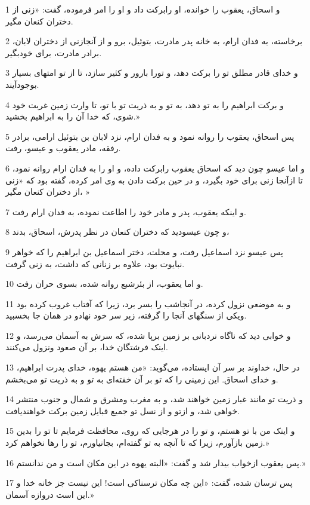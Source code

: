 \par 1 و اسحاق، یعقوب را خوانده، او رابرکت داد و او را امر فرموده، گفت: «زنی از دختران کنعان مگیر.
\par 2 برخاسته، به فدان ارام، به خانه پدر مادرت، بتوئیل، برو و از آنجازنی از دختران لابان، برادر مادرت، برای خودبگیر.
\par 3 و خدای قادر مطلق تو را برکت دهد، و تورا بارور و کثیر سازد، تا از تو امتهای بسیار بوجودآیند.
\par 4 و برکت ابراهیم را به تو دهد، به تو و به ذریت تو با تو، تا وارث زمین غربت خود شوی، که خدا آن را به ابراهیم بخشید.»
\par 5 پس اسحاق، یعقوب را روانه نمود و به فدان ارام، نزد لابان بن بتوئیل ارامی، برادر رفقه، مادر یعقوب و عیسو، رفت.
\par 6 و اما عیسو چون دید که اسحاق یعقوب رابرکت داده، و او را به فدان ارام روانه نمود، تا ازآنجا زنی برای خود بگیرد، و در حین برکت دادن به وی امر کرده، گفته بود که «زنی از دختران کنعان مگیر، »
\par 7 و اینکه یعقوب، پدر و مادر خود را اطاعت نموده، به فدان ارام رفت.
\par 8 و چون عیسودید که دختران کنعان در نظر پدرش، اسحاق، بدند،
\par 9 پس عیسو نزد اسماعیل رفت، و محلت، دختر اسماعیل بن ابراهیم را که خواهر نبایوت بود، علاوه بر زنانی که داشت، به زنی گرفت.
\par 10 و اما یعقوب، از بئرشبع روانه شده، بسوی حران رفت.
\par 11 و به موضعی نزول کرده، در آنجاشب را بسر برد، زیرا که آفتاب غروب کرده بود ویکی از سنگهای آنجا را گرفته، زیر سر خود نهادو در همان جا بخسبید.
\par 12 و خوابی دید که ناگاه نردبانی بر زمین برپا شده، که سرش به آسمان می‌رسد، و اینک فرشتگان خدا، بر آن صعود ونزول می‌کنند.
\par 13 در حال، خداوند بر سر آن ایستاده، می‌گوید: «من هستم یهوه، خدای پدرت ابراهیم، و خدای اسحاق. این زمینی را که تو بر آن خفته‌ای به تو و به ذریت تو می‌بخشم.
\par 14 و ذریت تو مانند غبار زمین خواهند شد، و به مغرب ومشرق و شمال و جنوب منتشر خواهی شد، و ازتو و از نسل تو جمیع قبایل زمین برکت خواهندیافت.
\par 15 و اینک من با تو هستم، و تو را در هرجایی که روی، محافظت فرمایم تا تو را بدین زمین بازآورم، زیرا که تا آنچه به تو گفته‌ام، بجانیاورم، تو را رها نخواهم کرد.»
\par 16 پس یعقوب ازخواب بیدار شد و گفت: «البته یهوه در این مکان است و من ندانستم.»
\par 17 پس ترسان شده، گفت: «این چه مکان ترسناکی است! این نیست جز خانه خدا و این است دروازه آسمان.»
